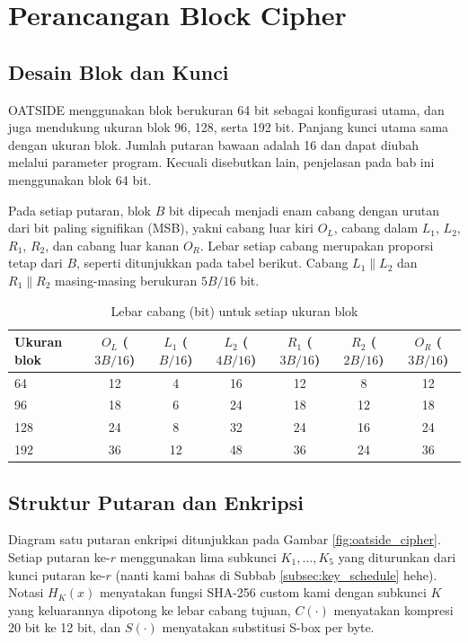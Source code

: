 \section{Perancangan Block Cipher}

\subsection{Desain Blok dan Kunci}
OATSIDE menggunakan blok berukuran 64 bit sebagai konfigurasi utama, dan juga mendukung ukuran blok 96, 128, serta 192 bit. Panjang kunci utama sama dengan ukuran blok. Jumlah putaran bawaan adalah 16 dan dapat diubah melalui parameter program. Kecuali disebutkan lain, penjelasan pada bab ini menggunakan blok 64 bit.

Pada setiap putaran, blok $B$ bit dipecah menjadi enam cabang dengan urutan dari bit paling signifikan (MSB), yakni cabang luar kiri $O_L$, cabang dalam $L_1$, $L_2$, $R_1$, $R_2$, dan cabang luar kanan $O_R$. Lebar setiap cabang merupakan proporsi tetap dari $B$, seperti ditunjukkan pada tabel berikut. Cabang $L_1 \| L_2$ dan $R_1 \| R_2$ masing-masing berukuran $5B/16$ bit.

\begin{table}[H]
    \centering
    \small
    \caption{Lebar cabang (bit) untuk setiap ukuran blok}
    \label{tab:lebar_cabang}
    \begin{tabular}{@{}lcccccc@{}}
        \toprule
        \textbf{Ukuran blok} & $O_L$ ($3B/16$) & $L_1$ ($B/16$) & $L_2$ ($4B/16$) & $R_1$ ($3B/16$) & $R_2$ ($2B/16$) & $O_R$ ($3B/16$) \\
        \midrule
        64  & 12 & 4  & 16 & 12 & 8  & 12 \\
        96  & 18 & 6  & 24 & 18 & 12 & 18 \\
        128 & 24 & 8  & 32 & 24 & 16 & 24 \\
        192 & 36 & 12 & 48 & 36 & 24 & 36 \\
        \bottomrule
    \end{tabular}
\end{table}

\subsection{Struktur Putaran dan Enkripsi}
Diagram satu putaran enkripsi ditunjukkan pada Gambar \ref{fig:oatside_cipher}. Setiap putaran ke-$r$ menggunakan lima subkunci $K_1, \ldots, K_5$ yang diturunkan dari kunci putaran ke-$r$ (nanti kami bahas di Subbab \ref{subsec:key_schedule} hehe). Notasi $H_K(x)$ menyatakan fungsi SHA-256 custom kami dengan subkunci $K$ yang keluarannya dipotong ke lebar cabang tujuan, $C(\cdot)$ menyatakan kompresi 20 bit ke 12 bit, dan $S(\cdot)$ menyatakan substitusi S-box per byte.

